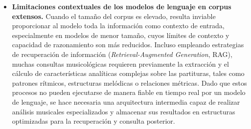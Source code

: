 \begin{itemize}
\item \textbf{Limitaciones contextuales de los modelos de lenguaje en corpus extensos.} Cuando el tamaño del corpus es elevado, resulta inviable proporcionar al modelo toda la información como contexto de entrada, especialmente en modelos de menor tamaño, cuyos límites de contexto y capacidad de razonamiento son más reducidos. Incluso empleando estrategias de recuperación de información (\textit{Retrieval-Augmented Generation}, RAG), muchas consultas musicológicas requieren previamente la extracción y el cálculo de características analíticas complejas sobre las partituras, tales como patrones rítmicos, estructuras melódicas o relaciones métricas. Dado que estos procesos no pueden ejecutarse de manera fiable en tiempo real por un modelo de lenguaje, se hace necesaria una arquitectura intermedia capaz de realizar análisis musicales especializados y almacenar sus resultados en estructuras optimizadas para la recuperación y consulta posterior.
\end{itemize}